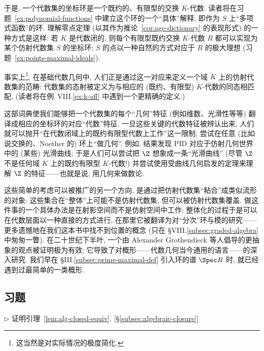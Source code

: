 于是, 一个代数集的坐标环是一个既约的、有限型的交换 $K$-代数. 读者将在习题~\ref{ex:polynomial-functions} 中建立这个环的一个``具体''解释, 即作为 $S$ 上``多项式函数''的环. 理解零点定理 (以其作为推论~\ref{cor:agc-dictionary} 的表现形式) 的一种方式是这样: 若 $K$ 是代数闭的, 则每个有限型既约交换 $K$-代数 $R$ 都可以实现为某个仿射代数集 $S$ 的坐标环; $S$ 的点以一种自然的方式对应于 $R$ 的极大理想 (习题~\ref{ex:points-maximal-ideals}).

事实上\footnote{这当然是对实际情况的极度简化.}, 在基础代数几何中, 人们正是通过这一对应来定义一个域 $K$ 上的仿射代数集的范畴: 代数集的态射被定义为与相应的 (既约、有限型) $K$-代数的同态相匹配. (读者将在例~VIII.\ref{ex:k-aff} 中遇到一个更精确的定义.)

这部词典使我们能够把一个代数集的每个``几何''特征 (例如维数、光滑性等等) 翻译成相应的坐标环的对应``代数''特征. 一旦这些关键的代数特征被辨认出来, 人们就可以抛开``在代数闭域上的既约有限型代数上工作''这一限制, 尝试在任意 (比如说交换的、Noether 的) 环上``做几何''. 例如, 结果发现 PID 对应于仿射几何世界中的 (某些) 光滑曲线; 于是人们可以尝试把 $\Z$ 想象成一条``光滑曲线'' (尽管 $\Z$ 不是任何域 $K$ 上的既约有限型 $K$-代数!) 并尝试使用受曲线几何启发的定理来理解 $\Z$ 的特征——也就是说, 用几何来做数论.

这些简单的考虑可以被推广的另一个方向, 是通过把仿射代数集``粘合''成类似流形的对象: 这些集合在``整体''上可能不是仿射代数集, 但可以被仿射代数集覆盖. 做这件事的一个具体办法是在射影空间而不是仿射空间中工作; 整体化的过程于是可以在代数层面以一种直接的方式进行, 在那里它被翻译为对``分次''环与模的研究——更多遗憾地在我们这本书中找不到位置的概念 (只在 §VIII.\ref{subsec:graded-algebra} 中匆匆一瞥). 在二十世纪下半叶, 一个由 Alexander Grothendieck 等人倡导的更抽象的观点被证明极为有效; 它导致了对概形——代数几何当今通用的语言——的深入研究. 我们早在 §III.\ref{subsec:prime-maximal-def} 引入环的谱 $\Spec R$ 时, 就已经遇到过最简单的一类概形.

\subsection*{习题}
{}

\begin{prob}\label{ex:alg-closed-equiv-proof}
$\triangleright$ 证明引理~\ref{lem:alg-closed-equiv}. [§\ref{subsec:algebraic-closure}]
\end{prob}

